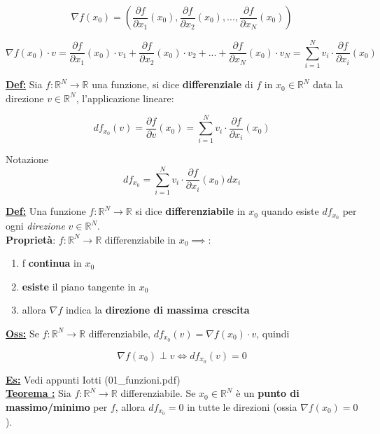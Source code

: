 \documentclass[a4paper,12pt]{article}
\newcommand{\definizione}{\noindent\textbf{\underline{Def:}} }
\newcommand{\osservazione}{\noindent\textbf{\underline{Oss:}} }
\newcommand{\esempio}{\noindent\textbf{\underline{Es:}} }
\newcommand{\teorema}[1]{\noindent\textbf{\underline{Teorema #1 :}} }
\begin{document}
	\[
	\nabla f(x_0) = ( \frac{\partial f}{\partial x_1} (x_0), \frac{\partial f}{\partial x_2} (x_0), ..., \frac{\partial f}{\partial x_N} (x_0) )
	\]

	\[
	\nabla f(x_0) \cdot v = \frac{\partial f}{\partial x_1} (x_0) \cdot v_1 + \frac{\partial f}{\partial x_2} (x_0) \cdot v_2 + ... + \frac{\partial f}{\partial x_N} (x_0) \cdot v_N = \sum_{i=1}^{N} v_i \cdot \frac{\partial f}{\partial x_i} (x_0)
	\]

	\definizione Sia $f : \mathbb{R}^N \rightarrow \mathbb{R}$ una funzione, si dice \textbf{differenziale} di $f$ in $x_0 \in \mathbb{R}^N$ data la direzione $v \in \mathbb{R}^N$, l'applicazione lineare:

	\[
	df_{x_0}(v) = \frac{\partial f}{\partial v} (x_0) = \sum_{i=1}^{N} v_i \cdot \frac{\partial f}{\partial x_i} (x_0)
	\]

	\noindent Notazione
	\[
	df_{x_0} = \sum_{i=1}^{N} v_i \cdot \frac{\partial f}{\partial x_i} (x_0) dx_i
	\]

	\definizione Una funzione $f : \mathbb{R}^N \rightarrow \mathbb{R}$ si dice \textbf{differenziabile} in $x_0$ quando esiste $df_{x_0}$ per ogni \textit{direzione} $v \in \mathbb{R}^N$. \\

	\noindent \textbf{Proprietà}: $f : \mathbb{R}^N \rightarrow \mathbb{R} \text{ differenziabile in } x_0 \implies$:

	\begin{enumerate}
		\item f \textbf{continua} in $x_0$
		\item \textbf{esiste} il piano tangente in $x_0$
		\item allora $\nabla f$ indica la \textbf{direzione di massima crescita}
	\end{enumerate}

	\osservazione Se $f : \mathbb{R}^N \rightarrow \mathbb{R}$ differenziabile, $df_{x_0}(v) = \nabla f (x_0) \cdot v$, quindi

	\[
	\nabla f(x_0) \perp v \iff df_{x_0}(v) = 0
	\]

	\esempio Vedi appunti Iotti (01\_funzioni.pdf) \\

	\teorema{} Sia $f : \mathbb{R}^N \rightarrow \mathbb{R}$ differenziabile. Se $x_0 \in \mathbb{R}^N$ è un \textbf{punto di massimo/minimo} per $f$, allora $df_{x_0} = 0$ in tutte le direzioni (ossia $\nabla f(x_0) = 0$). \\
\end{document}

